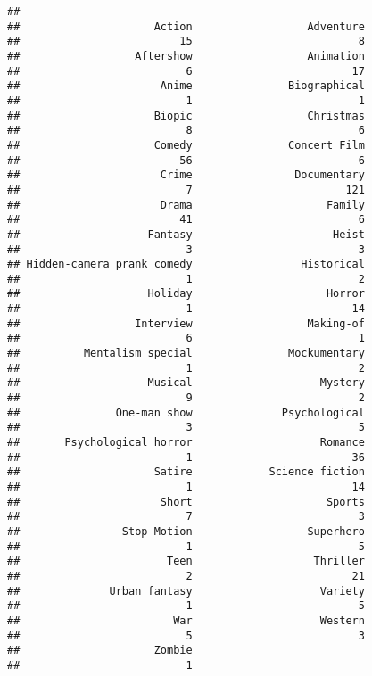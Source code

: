 \documentclass[
]{article}
\begin{document}
\begin{verbatim}
## 
##                     Action                  Adventure 
##                         15                          8 
##                  Aftershow                  Animation 
##                          6                         17 
##                      Anime               Biographical 
##                          1                          1 
##                     Biopic                  Christmas 
##                          8                          6 
##                     Comedy               Concert Film 
##                         56                          6 
##                      Crime                Documentary 
##                          7                        121 
##                      Drama                     Family 
##                         41                          6 
##                    Fantasy                      Heist 
##                          3                          3 
## Hidden-camera prank comedy                 Historical 
##                          1                          2 
##                    Holiday                     Horror 
##                          1                         14 
##                  Interview                  Making-of 
##                          6                          1 
##          Mentalism special               Mockumentary 
##                          1                          2 
##                    Musical                    Mystery 
##                          9                          2 
##               One-man show              Psychological 
##                          3                          5 
##       Psychological horror                    Romance 
##                          1                         36 
##                     Satire            Science fiction 
##                          1                         14 
##                      Short                     Sports 
##                          7                          3 
##                Stop Motion                  Superhero 
##                          1                          5 
##                       Teen                   Thriller 
##                          2                         21 
##              Urban fantasy                    Variety 
##                          1                          5 
##                        War                    Western 
##                          5                          3 
##                     Zombie 
##                          1
\end{verbatim}
\end{document}
